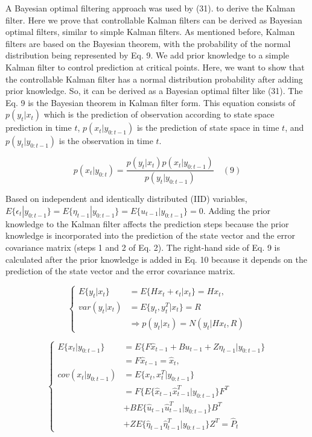 \documentclass[12pt,a4paper]{article}
\begin{document}
	A Bayesian optimal filtering approach was used by (31). to derive the Kalman filter. Here we prove that controllable Kalman filters can be derived as Bayesian optimal filters, similar to simple Kalman filters. As mentioned before, Kalman filters are based on the Bayesian theorem, with the probability of the normal distribution being represented by Eq. 9. We add prior knowledge to a simple Kalman filter to control prediction at critical points. Here, we want to show that the controllable Kalman filter has a normal distribution probability after adding prior knowledge. So, it can be derived as a Bayesian optimal filter like (31). The Eq. 9 is the Bayesian theorem in Kalman filter form. This equation consists of \(p(y_t|x_t)\) which is the prediction of observation according to state space prediction in time \(t\), \(p(x_t|y_{0:t - 1})\) is the prediction of state space in time \(t\), and \(p(y_t|y_{0:t - 1})\) is the observation in time \(t\).
	
	\begin{equation}
		p(x_t|y_{0:t}) = \frac{p(y_t|x_t)p(x_t|y_{0:t - 1})}{p(y_t|y_{0:t - 1})} \quad (9)
	\end{equation}
	
	Based on independent and identically distributed (IID) variables, \(E\{\epsilon_t|y_{0:t - 1}\} = E\{\eta_{t - 1}|y_{0:t - 1}\} = E\{u_{t - 1}|y_{0:t - 1}\} = 0\). Adding the prior knowledge to the Kalman filter affects the prediction steps because the prior knowledge is incorporated into the prediction of the state vector and the error covariance matrix (steps 1 and 2 of Eq. 2). The right-hand side of Eq. 9 is calculated after the prior knowledge is added in Eq. 10 because it depends on the prediction of the state vector and the error covariance matrix.
	
	\begin{equation}
		\left\{ \begin{array}{ll}E\{y_t|x_t\} & = E\{Hx_t + \epsilon_t|x_t\} = Hx_t,\\
			var(y_t|x_t) & = E\{y_t,y_t^T|x_t\} = R\\
			& \Rightarrow p(y_t|x_t) = N(y_t|Hx_t,R) \end{array} \right.
	\end{equation}
	
	\begin{equation}
		\left\{ \begin{array}{ll}E\{x_t|y_{0:t - 1}\} & = E\{F\hat{x}_{t - 1} + Bu_{t - 1} + Z\eta_{t - 1}|y_{0:t - 1}\} \\
			& = F\hat{x}_{t - 1} = \hat{x}_t,\\
			cov(x_t|y_{0:t - 1}) & = E\{x_t,x_t^T|y_{0:t - 1}\} \\
			& = F\{E\{\hat{x}_{t - 1}\hat{x}_{t - 1}^T|y_{0:t - 1}\} F^T \\
			& +BE\{\hat{u}_{t - 1}\hat{u}_{t - 1}^T|y_{0:t - 1}\} B^T \\
			& +ZE\{\hat{\eta}_{t - 1}\hat{\eta}_{t - 1}^T|y_{0:t - 1}\} Z^T = \hat{P}_t \end{array} \right.
	\end{equation}
	
\end{document}
